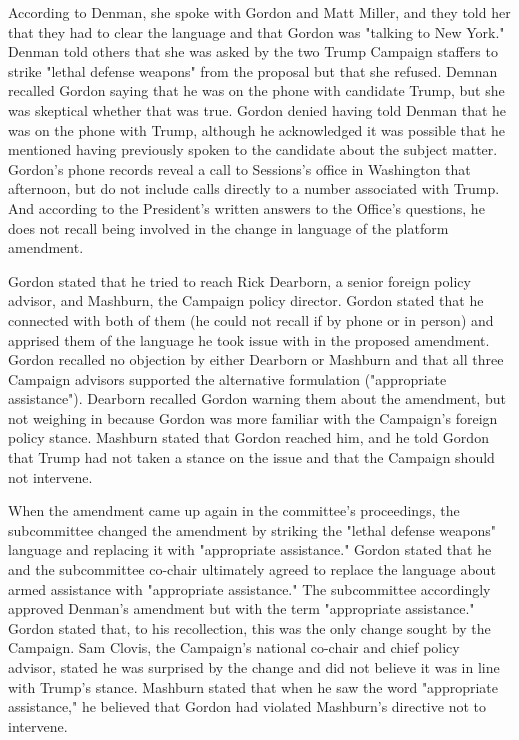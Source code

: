 According to Denman, she spoke with Gordon and Matt Miller, and they told her that they had to clear the language and that Gordon was "talking to New York."%
Denman told others that she was asked by the two Trump Campaign staffers to strike "lethal defense weapons" from the proposal but that she refused.%
Demnan recalled Gordon saying that he was on the phone with candidate Trump, but she was skeptical whether that was true.%
Gordon denied having told Denman that he was on the phone with Trump, although he acknowledged it was possible that he mentioned having previously spoken to the candidate about the subject matter.%
Gordon's phone records reveal a call to Sessions's office in Washington that afternoon, but do not include calls directly to a number associated with Trump.%
And according to the President's written answers to the Office's questions, he does not recall being involved in the change in language of the platform amendment.%

Gordon stated that he tried to reach Rick Dearborn, a senior foreign policy advisor, and Mashburn, the Campaign policy director.
Gordon stated that he connected with both of them (he could not recall if by phone or in person) and apprised them of the language he took issue with in the proposed amendment.
Gordon recalled no objection by either Dearborn or Mashburn and that all three Campaign advisors supported the alternative formulation ("appropriate assistance").%
Dearborn recalled Gordon warning them about the amendment, but not weighing in because Gordon was more familiar with the Campaign's foreign policy stance.%
Mashburn stated that Gordon reached him, and he told Gordon that Trump had not taken a stance on the issue and that the Campaign should not intervene.%

When the amendment came up again in the committee's proceedings, the subcommittee changed the amendment by striking the "lethal defense weapons" language and replacing it with "appropriate assistance."%
Gordon stated that he and the subcommittee co-chair ultimately agreed to replace the language about armed assistance with "appropriate assistance."%
The subcommittee accordingly approved Denman's amendment but with the term "appropriate assistance."%
Gordon stated that, to his recollection, this was the only change sought by the Campaign.%
Sam Clovis, the Campaign's national co-chair and chief policy advisor, stated he was surprised by the change and did not believe it was in line with Trump's stance.%
Mashburn stated that when he saw the word "appropriate assistance," he believed that Gordon had violated Mashburn's directive not to intervene.%

